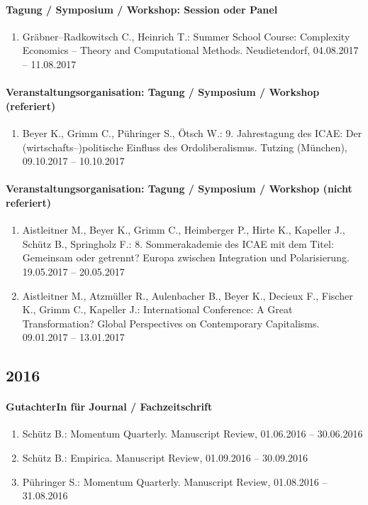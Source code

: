 \paragraph{Tagung / Symposium / Workshop: Session oder Panel}
\begin{enumerate}[leftmargin=*, labelsep=0.5cm]
\item Gräbner--Radkowitsch C., Heinrich T.: Summer School Course: Complexity Economics -- Theory and Computational Methods. Neudietendorf, 04.08.2017 -- 11.08.2017
\end{enumerate}
\paragraph{Veranstaltungsorganisation: Tagung / Symposium / Workshop (referiert)}
\begin{enumerate}[leftmargin=*, labelsep=0.5cm]
\item Beyer K., Grimm C., Pühringer S., Ötsch W.: 9. Jahrestagung des ICAE: Der (wirtschafts--)politische Einfluss des Ordoliberalismus. Tutzing (München), 09.10.2017 -- 10.10.2017
\end{enumerate}
\paragraph{Veranstaltungsorganisation: Tagung / Symposium / Workshop (nicht referiert)}
\begin{enumerate}[leftmargin=*, labelsep=0.5cm]
\item Aistleitner M., Beyer K., Grimm C., Heimberger P., Hirte K., Kapeller J., Schütz B., Springholz F.: 8. Sommerakademie des ICAE mit dem Titel: Gemeinsam oder getrennt? Europa zwischen Integration und Polarisierung. 19.05.2017 -- 20.05.2017
\item Aistleitner M., Atzmüller R., Aulenbacher B., Beyer K., Decieux F., Fischer K., Grimm C., Kapeller J.: International Conference: A Great Transformation? Global Perspectives on Contemporary Capitalisms. 09.01.2017 -- 13.01.2017
\end{enumerate}\subsection*{2016}\paragraph{GutachterIn für Journal / Fachzeitschrift}
\begin{enumerate}[leftmargin=*, labelsep=0.5cm]
\item Schütz B.: Momentum Quarterly. Manuscript Review, 01.06.2016 -- 30.06.2016
\item Schütz B.: Empirica. Manuscript Review, 01.09.2016 -- 30.09.2016
\item Pühringer S.: Momentum Quarterly. Manuscript Review, 01.08.2016 -- 31.08.2016
\end{enumerate}
